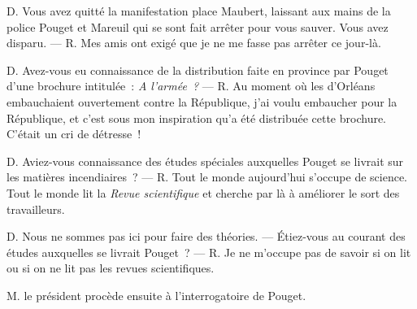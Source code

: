 \documentclass[french,twoside]{book} %
\def\mednobreak{\ifdim\lastskip<\medskipamount
  \removelastskip\nopagebreak\medskip\fi}
\newcommand{\labelblock}[1]{\medbreak{\noindent\color{rubric}\bfseries #1}\par\mednobreak}
\begin{document}
D. Vous avez quitté la manifestation place Maubert, laissant aux mains de la police Pouget et Mareuil qui se sont fait arrêter pour vous sauver. Vous avez disparu. — R. Mes amis ont exigé que je ne me fasse pas arrêter ce jour-là.\par
D. Avez-vous eu connaissance de la distribution faite en province par Pouget d’une brochure intitulée : \emph{A l’armée ?} — R. Au moment où les d’Orléans embauchaient ouvertement contre la République, j’ai voulu embaucher pour la République, et c’est sous mon inspiration qu’a été distribuée cette brochure. C’était un cri de détresse !\par
D. Aviez-vous connaissance des études spéciales auxquelles Pouget se livrait sur les matières incendiaires ? — R. Tout le monde aujourd’hui s’occupe de science. Tout le monde lit la \emph{Revue scientifique} et cherche par là à améliorer le sort des travailleurs.\par
D. Nous ne sommes pas ici pour faire des théories. — Étiez-vous au courant des études auxquelles se livrait Pouget ? — R. Je ne m’occupe pas de savoir si on lit ou si on ne lit pas les revues scientifiques.\par
M. le président procède ensuite à l’interrogatoire de Pouget.\par

\labelblock{AUDITION DES TÉMOINS}
\end{document}
